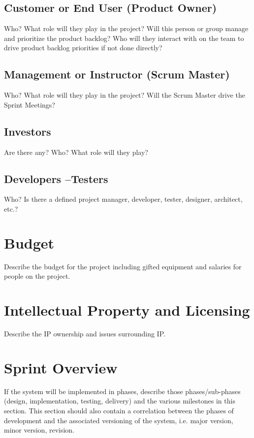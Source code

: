 \subsection{Customer or End User (Product Owner)}
Who?  What role will they play in the project?  Will this person or group manage 
and prioritize the product backlog?  Who will they interact with on the team to 
drive product backlog priorities if not done directly? 

\subsection{Management or Instructor (Scrum Master)}
Who?  What role will they play in the project?  Will the Scrum Master drive the 
Sprint Meetings? 


\subsection{Investors}
Are there any?  Who?  What role will they play? 


\subsection{Developers --Testers}
Who?  Is there a defined project manager, developer, tester, designer, architect, 
etc.? 

\section{Budget}
Describe the budget for the project including gifted equipment and salaries for 
people on the project.

\section{Intellectual Property and Licensing}
Describe the IP ownership and issues surrounding IP.

\section{Sprint  Overview}
If the system will be implemented in phases, describe those phases/sub-phases (design, 
implementation, testing, delivery) and the various milestones in this section. 
 This section should also contain a correlation between the phases of development 
and the associated versioning of the system, i.e. major version, minor version, 
revision. 

